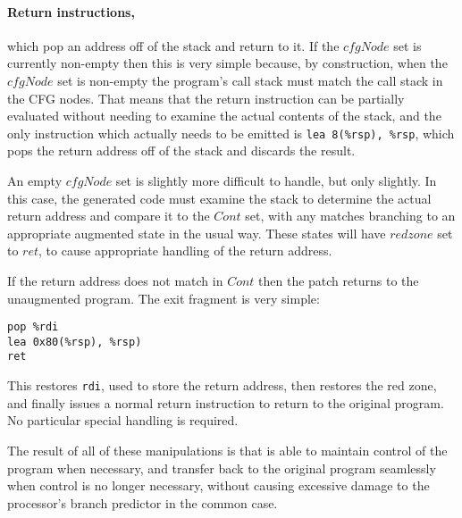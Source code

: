 \paragraph{Return instructions,} which pop an address off of the stack
and return to it.  If the $cfgNode$ set is currently non-empty then
this is very simple because, by construction, when the $cfgNode$ set
is non-empty the program's call stack must match the call stack in the
CFG nodes.  That means that the return instruction can be partially
evaluated without needing to examine the actual contents of the stack,
and the only instruction which actually needs to be emitted is
\verb|lea 8(%rsp), %rsp|, which pops the return address off of the
stack and discards the result.  


An empty $cfgNode$ set is slightly more difficult to handle, but only
slightly.  In this case, the generated code must examine the stack to
determine the actual return address and compare it to the $Cont$ set,
with any matches branching to an appropriate augmented state in the
usual way.  These states will have $redzone$ set to $ret$, to cause
appropriate handling of the return address.

If the return address does not match in $Cont$ then the patch returns
to the unaugmented program.  The exit fragment is very simple:

\begin{verbatim}
pop %rdi
lea 0x80(%rsp), %rsp)
ret
\end{verbatim}

This restores \verb|rdi|, used to store the return address, then
restores the red zone, and finally issues a normal return instruction
to return to the original program.  No particular special handling is
required.


The result of all of these manipulations is that {\technique} is able
to maintain control of the program when necessary, and transfer back
to the original program seamlessly when control is no longer
necessary, without causing excessive damage to the processor's branch
predictor in the common case.

